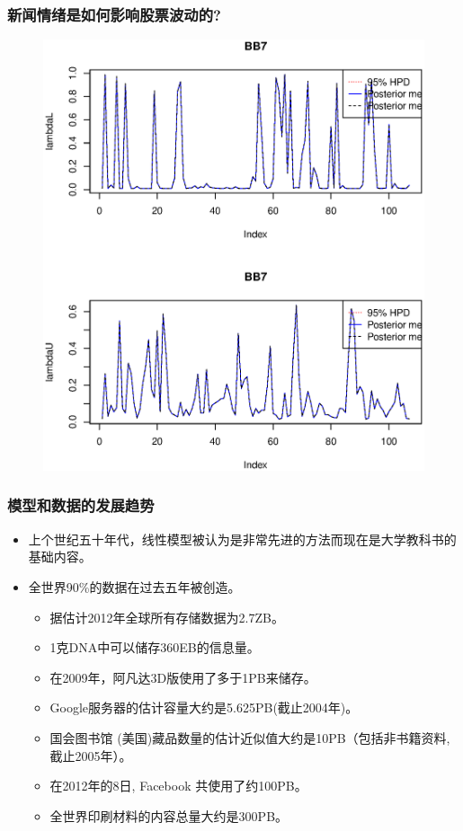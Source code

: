 \documentclass[11pt]{beamer}
\begin{document}
\begin{frame}
  \frametitle{新闻情绪是如何影响股票波动的?}
  \begin{figure}
    \centering
    \includegraphics[height=0.9\textheight]{plot/lambdaLU}\\
  \end{figure}
\end{frame}



\begin{frame}
  \frametitle{模型和数据的发展趋势}

  \begin{itemize}
  \item 上个世纪五十年代，线性模型被认为是非常先进的方法而现在是大学教科书的基础内容。
  \item 全世界90\%的数据在过去五年被创造。
    \begin{itemize}

    \item 据估计2012年全球所有存储数据为2.7ZB。
    \item 1克DNA中可以储存360EB的信息量。
    \item 在2009年，阿凡达3D版使用了多于1PB来储存。
    \item Google服务器的估计容量大约是5.625PB(截止2004年)。
    \item 国会图书馆 (美国)藏品数量的估计近似值大约是10PB（包括非书籍资料, 截止2005年）。
    \item 在2012年的8日, Facebook 共使用了约100PB。
    \item 全世界印刷材料的内容总量大约是300PB。
    \end{itemize}
  \end{itemize}
\end{frame}
\end{document}
